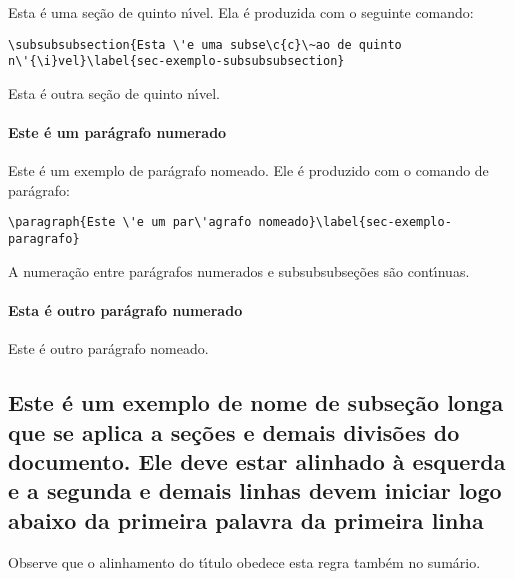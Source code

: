 Esta \'e uma se\c{c}\~ao de quinto n\'{\i}vel. Ela \'e produzida com o seguinte comando:

\begin{verbatim}
\subsubsubsection{Esta \'e uma subse\c{c}\~ao de quinto
n\'{\i}vel}\label{sec-exemplo-subsubsubsection}
\end{verbatim}

\label{sec-exemplo-subsubsubsection-outro}

Esta \'e outra se\c{c}\~ao de quinto n\'{\i}vel.


\paragraph{Este \'e um par\'agrafo numerado}\label{sec-exemplo-paragrafo}

Este \'e um exemplo de par\'agrafo nomeado. Ele \'e produzido com o comando de
par\'agrafo:

\begin{verbatim}
\paragraph{Este \'e um par\'agrafo nomeado}\label{sec-exemplo-paragrafo}
\end{verbatim}

A numera\c{c}\~ao entre par\'agrafos numerados e subsubsubse\c{c}\~oes s\~ao cont\'{\i}nuas.

\paragraph{Esta \'e outro par\'agrafo numerado}\label{sec-exemplo-paragrafo-outro}

Este \'e outro par\'agrafo nomeado.

\subsection{Este \'e um exemplo de nome de subse\c{c}\~ao longa que se aplica a se\c{c}\~oes e demais divis\~oes do documento. Ele deve estar alinhado \`a esquerda e a segunda e demais linhas devem iniciar logo abaixo da primeira palavra da primeira linha} 

Observe que o alinhamento do t\'{\i}tulo obedece esta regra tamb\'em no sum\'ario.
	






